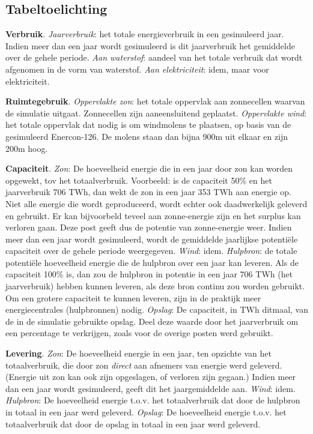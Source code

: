 \documentclass[
  11pt,
  a4paper,
]{book}
\begin{document}
\noindent

\hypertarget{tabeltoelichting}{%
\subsection{Tabeltoelichting}\label{tabeltoelichting}}

\bigskip

\noindent 
\textbf{Verbruik}. \emph{Jaarverbruik}: het totale energieverbruik in een gesimuleerd jaar. Indien meer dan een jaar wordt gesimuleerd is dit jaarverbruik het gemiddelde over de gehele periode. \emph{Aan waterstof}: aandeel van het totale verbruik dat wordt afgenomen in de vorm van waterstof. \emph{Aan elektriciteit}: idem, maar voor elektriciteit.

\noindent 
\textbf{Ruimtegebruik}. \emph{Oppervlakte zon}: het totale oppervlak aan zonnecellen waarvan de simulatie uitgaat. Zonnecellen zijn aaneensluitend geplaatst. \emph{Oppervlakte wind}: het totale oppervlak dat nodig is om windmolens te plaatsen, op basis van de gesimuleerd Enercon-126. De molens staan dan bijna 900m uit elkaar en zijn 200m hoog.

\noindent 
\textbf{Capaciteit}. \emph{Zon}: De hoeveelheid energie die in een jaar door zon kan worden opgewekt, tov het totaalverbruik. Voorbeeld: is de capaciteit 50\% en het jaarverbruik 706 TWh, dan wekt de zon in een jaar 353 TWh aan energie op. Niet alle energie die wordt geproduceerd, wordt echter ook daadwerkelijk geleverd en gebruikt. Er kan bijvoorbeld teveel aan zonne-energie zijn en het surplus kan verloren gaan. Deze post geeft dus de potentie van zonne-energie weer. Indien meer dan een jaar wordt gesimuleerd, wordt de gemiddelde jaarlijkse potentiële capaciteit over de gehele periode weergegeven. \emph{Wind}: idem. \emph{Hulpbron}: de totale potentiële hoeveelheid energie die de hulpbron over een jaar kan leveren. Als de capaciteit 100\% is, dan zou de hulpbron in potentie in een jaar 706 TWh (het jaarverbruik) hebben kunnen leveren, als deze bron continu zou worden gebruikt. Om een grotere capaciteit te kunnen leveren, zijn in de praktijk meer energiecentrales (hulpbronnen) nodig. \emph{Opslag}: De capaciteit, in TWh ditmaal, van de in de simulatie gebruikte opslag. Deel deze waarde door het jaarverbruik om een percentage te verkrijgen, zoals voor de overige posten werd gebruikt.

\noindent 
\textbf{Levering}. \emph{Zon}: De hoeveelheid energie in een jaar, ten opzichte van het totaalverbruik, die door zon \emph{direct} aan afnemers van energie werd geleverd. (Energie uit zon kan ook zijn opgeslagen, of verloren zijn gegaan.) Indien meer dan een jaar wordt gesimuleerd, geeft dit het jaargemiddelde aan. \emph{Wind}: idem. \emph{Hulpbron}: De hoeveelheid energie t.o.v. het totaalverbruik dat door de hulpbron in totaal in een jaar werd geleverd. \emph{Opslag}: De hoeveelheid energie t.o.v. het totaalverbruik dat door de opslag in totaal in een jaar werd geleverd.
\end{document}
